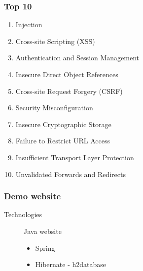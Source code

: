 \begin{frame}
\frametitle{Top 10}
\begin{enumerate}
\item Injection
\item Cross-site Scripting (XSS)
\item Authentication and Session Management
\item Insecure Direct Object References
\item Cross-site Request Forgery (CSRF)
\item Security Misconfiguration
\item Insecure Cryptographic Storage
\item Failure to Restrict URL Access
\item Insufficient Transport Layer Protection
\item Unvalidated Forwards and Redirects
\end{enumerate}
\end{frame}

\begin{frame}
\frametitle{Demo website}
\begin{description}
\item[Technologies]
	Java website
	\hfill
	\begin{itemize}
	\item Spring
	\item Hibernate - h2database
	\end{itemize}
\end{description}
\end{frame}

